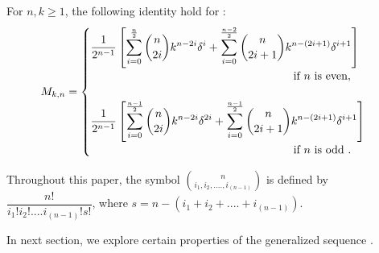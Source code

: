 \begin{theorem}For $n,k\geq{1}$, the following identity hold for \M\vspace{.5mm}:
\begin{align*}
 M_{k,n}= \begin{cases}
\dfrac{1}{2^{n-1}}\left[\displaystyle\sum_{i=0}^{\frac{n}{2}} \binom{n}{2i}k^{n-2i}\delta^i+\displaystyle\sum_{i=0}^{\frac{n-2}{2}} \binom{n}{2i+1}k^{n-(2i+1)}\delta^{i+1} \right]\\\qquad \qquad \qquad \qquad \qquad \qquad  \qquad \qquad \qquad \text{if $n$ is even},
\vspace{5mm}\\
\dfrac{1}{2^{n-1}}\left[\displaystyle\sum_{i=0}^{\frac{n-1}{2}} \binom{n}{2i}k^{n-2i}\delta^{2i}+\displaystyle\sum_{i=0}^{\frac{n-1}{2}} \binom{n}{2i+1}k^{n-(2i+1)}\delta^{i+1} \right]\\\qquad \qquad \qquad \qquad \qquad \qquad  \qquad \qquad \qquad\text{if $n$ is odd }.
 \end{cases}
\end{align*} 
\end{theorem}
\noindent Throughout this paper, the symbol $\binom{n}{i_1,i_2,....,i_{(n-1)}}$ is defined by $\dfrac{n!}{i_1!i_2!....i_{(n-1)} !s!}$, where $s=n-(i_1+i_2+....+i_{(n-1)})$.

\noindent In next section, we explore certain properties of the generalized \kL\vspace{.5mm} sequence \M. 
